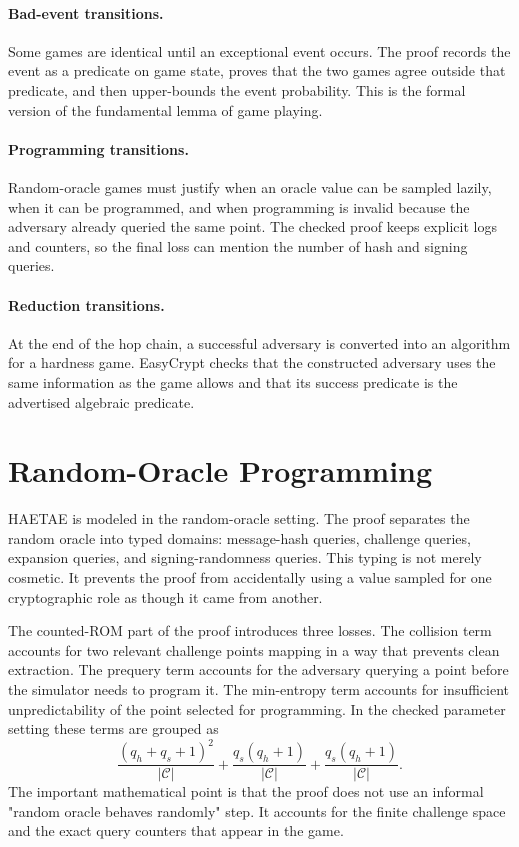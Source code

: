 \documentclass[11pt]{report}
\theoremstyle{definition}
\theoremstyle{plain}
\theoremstyle{definition}
\begin{document}
\paragraph{Bad-event transitions.}
Some games are identical until an exceptional event occurs.  The proof records
the event as a predicate on game state, proves that the two games agree outside
that predicate, and then upper-bounds the event probability.  This is the
formal version of the fundamental lemma of game playing.

\paragraph{Programming transitions.}
Random-oracle games must justify when an oracle value can be sampled lazily,
when it can be programmed, and when programming is invalid because the
adversary already queried the same point.  The checked proof keeps explicit
logs and counters, so the final loss can mention the number of hash and signing
queries.

\paragraph{Reduction transitions.}
At the end of the hop chain, a successful adversary is converted into an
algorithm for a hardness game.  EasyCrypt checks that the constructed adversary
uses the same information as the game allows and that its success predicate is
the advertised algebraic predicate.

\section*{Random-Oracle Programming}

HAETAE is modeled in the random-oracle setting.  The proof separates the random
oracle into typed domains: message-hash queries, challenge queries, expansion
queries, and signing-randomness queries.  This typing is not merely cosmetic.
It prevents the proof from accidentally using a value sampled for one
cryptographic role as though it came from another.

The counted-ROM part of the proof introduces three losses.  The collision term
accounts for two relevant challenge points mapping in a way that prevents
clean extraction.  The prequery term accounts for the adversary querying a
point before the simulator needs to program it.  The min-entropy term accounts
for insufficient unpredictability of the point selected for programming.  In
the checked parameter setting these terms are grouped as
\[
  \frac{(q_h+q_s+1)^2}{|\mathcal{C}|}
  + \frac{q_s(q_h+1)}{|\mathcal{C}|}
  + \frac{q_s(q_h+1)}{|\mathcal{C}|}.
\]
The important mathematical point is that the proof does not use an informal
"random oracle behaves randomly" step.  It accounts for the finite challenge
space and the exact query counters that appear in the game.
\end{document}
